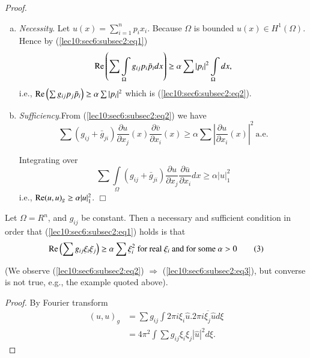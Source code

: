 \noindent \textit{Proof.}
\begin{enumerate}[(a)]
\item {\em Necessity}. Let $u(x) = \sum\limits_{i=1}^{n} p_i
  x_i$. Because $\Omega$ is bounded $u (x) \in H^1
  (\Omega)$. Hence by (\ref{lec10:sec6:subsec2:eq1}) 
\begin{gather*}
  \operatorname{Re} \left(\sum \int\limits_{\Omega} g_{ij} p_i \bar{p}_i dx\right) \geq \alpha
  \sum |p_i|^2 \int\limits_{\Omega}dx,
\end{gather*}
  i.e., \hspace{2.5cm} $\operatorname{Re} \left(\sum g_{ij} p_j \bar{p}_i \right)
  \geq \alpha \sum |p_i|^2$ \hfil which is  (\ref{lec10:sec6:subsec2:eq2}). 

\item \textit{Sufficiency}.\pageoriginale From (\ref{lec10:sec6:subsec2:eq2}) we have
$$
\sum (g_{ij} + \bar{g}_{ji}) \frac{\partial u}{\partial x_j} (x)
\frac{\partial \bar{v}}{\partial x_i} (x) \geq \alpha \sum
|\frac{\partial u}{\partial x_i} (x)|^2 ~\text{a.e.} 
$$

Integrating over   
$$
\sum \int\limits_{\Omega} (g_{ij} + \bar{g}_{ji}) \frac{\partial
  u}{\partial x_j} \frac{\partial \bar{u}}{\partial x_i} dx \geq
\alpha |u|^2_1 
$$
i.e., \hspace{4cm} $\operatorname{Re} (u, u)_g \geq \alpha |u|^2_1$. \hfill $\Box$
\end{enumerate}

\begin{theorem}\label{lec10:sec6:subsec2:thm6.2}%
  Let $\Omega = R^n$, and $g_{ij}$ be constant. Then a necessary and
  sufficient condition in order that (\ref{lec10:sec6:subsec2:eq1}) holds is that  
  \begin{equation*}
    \operatorname{Re}  \left(\sum g_{ij} \xi_i \xi_j\right) \geq \alpha \sum \xi_i ^2 \text{ for
      real }\xi_i \text{ and for some } \alpha > 0 \tag{3}\label{lec10:sec6:subsec2:eq3} 
  \end{equation*}
\end{theorem}

 (We observe (\ref{lec10:sec6:subsec2:eq2}) $\Longrightarrow$ (\ref{lec10:sec6:subsec2:eq3}),  but converse is not true, e.g., the example quoted above). 

\begin{proof}
  By Fourier transform
  \begin{align*}
    (u, u)_g & = \sum g_{ij} \int 2 \pi i \xi_i \hat{u}. \overline{2 \pi i
      \xi_j \hat{u} d \xi}\\ 
    & = 4 \pi^2 \int \sum g_{ij} \xi_i \xi_j |\hat{u}|^2 d \xi.
  \end{align*} 
\end{proof}
 
